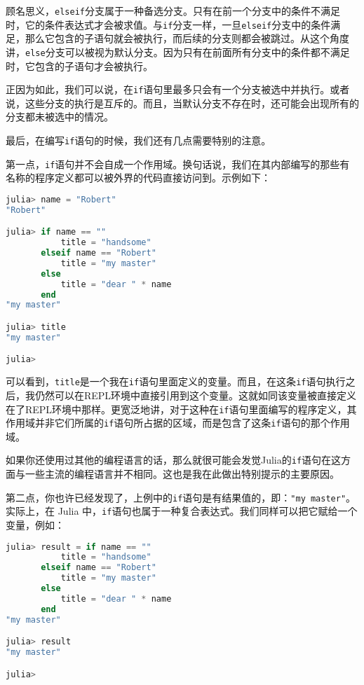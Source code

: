 顾名思义，\verb`elseif`分支属于一种备选分支。只有在前一个分支中的条件不满足时，它的条件表达式才会被求值。与\verb`if`分支一样，一旦\verb`elseif`分支中的条件满足，那么它包含的子语句就会被执行，而后续的分支则都会被跳过。从这个角度讲，\verb`else`分支可以被视为默认分支。因为只有在前面所有分支中的条件都不满足时，它包含的子语句才会被执行。

正因为如此，我们可以说，在\verb`if`语句里最多只会有一个分支被选中并执行。或者说，这些分支的执行是互斥的。而且，当默认分支不存在时，还可能会出现所有的分支都未被选中的情况。

最后，在编写\verb`if`语句的时候，我们还有几点需要特别的注意。

第一点，\verb`if`语句并不会自成一个作用域。换句话说，我们在其内部编写的那些有名称的程序定义都可以被外界的代码直接访问到。示例如下：

\begin{lstlisting}[language=julia]
julia> name = "Robert"
"Robert"

julia> if name == ""
           title = "handsome"
       elseif name == "Robert"
           title = "my master"
       else
           title = "dear " * name
       end
"my master"

julia> title
"my master"

julia> 
\end{lstlisting}

可以看到，\verb`title`是一个我在\verb`if`语句里面定义的变量。而且，在这条\verb`if`语句执行之后，我仍然可以在REPL环境中直接引用到这个变量。这就如同该变量被直接定义在了REPL环境中那样。更宽泛地讲，对于这种在\verb`if`语句里面编写的程序定义，其作用域并非它们所属的\verb`if`语句所占据的区域，而是包含了这条\verb`if`语句的那个作用域。

如果你还使用过其他的编程语言的话，那么就很可能会发觉Julia的\verb`if`语句在这方面与一些主流的编程语言并不相同。这也是我在此做出特别提示的主要原因。

第二点，你也许已经发现了，上例中的\verb`if`语句是有结果值的，即：\verb`"my master"`。实际上，在 Julia 中，\verb`if`语句也属于一种复合表达式。我们同样可以把它赋给一个变量，例如：

\begin{lstlisting}[language=julia]
julia> result = if name == ""
           title = "handsome"
       elseif name == "Robert"
           title = "my master"
       else
           title = "dear " * name
       end
"my master"

julia> result
"my master"

julia> 
\end{lstlisting}

